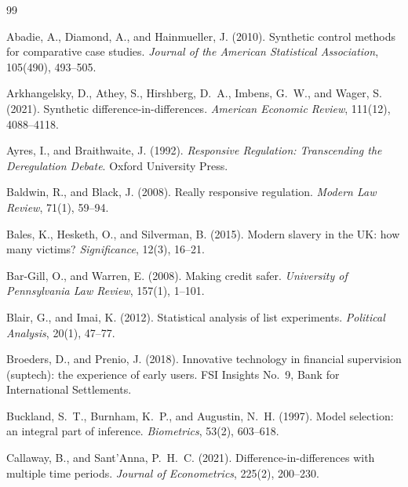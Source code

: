\documentclass[11pt]{article}
\theoremstyle{plain}
\theoremstyle{definition}
\theoremstyle{remark}
\begin{document}
\begin{thebibliography}{99}
\small
\setlength{\itemsep}{2pt}

Abadie, A., Diamond, A., and Hainmueller, J. (2010). Synthetic control methods for comparative case studies. \emph{Journal of the American Statistical Association}, 105(490), 493--505.

Arkhangelsky, D., Athey, S., Hirshberg, D.~A., Imbens, G.~W., and Wager, S. (2021). Synthetic difference-in-differences. \emph{American Economic Review}, 111(12), 4088--4118.

Ayres, I., and Braithwaite, J. (1992). \emph{Responsive Regulation: Transcending the Deregulation Debate}. Oxford University Press.

Baldwin, R., and Black, J. (2008). Really responsive regulation. \emph{Modern Law Review}, 71(1), 59--94.

Bales, K., Hesketh, O., and Silverman, B. (2015). Modern slavery in the UK: how many victims? \emph{Significance}, 12(3), 16--21.

Bar-Gill, O., and Warren, E. (2008). Making credit safer. \emph{University of Pennsylvania Law Review}, 157(1), 1--101.

Blair, G., and Imai, K. (2012). Statistical analysis of list experiments. \emph{Political Analysis}, 20(1), 47--77.

Broeders, D., and Prenio, J. (2018). Innovative technology in financial supervision (suptech): the experience of early users. FSI Insights No.~9, Bank for International Settlements.

Buckland, S.~T., Burnham, K.~P., and Augustin, N.~H. (1997). Model selection: an integral part of inference. \emph{Biometrics}, 53(2), 603--618.

Callaway, B., and Sant'Anna, P.~H.~C. (2021). Difference-in-differences with multiple time periods. \emph{Journal of Econometrics}, 225(2), 200--230.


\end{thebibliography}
\end{document}
